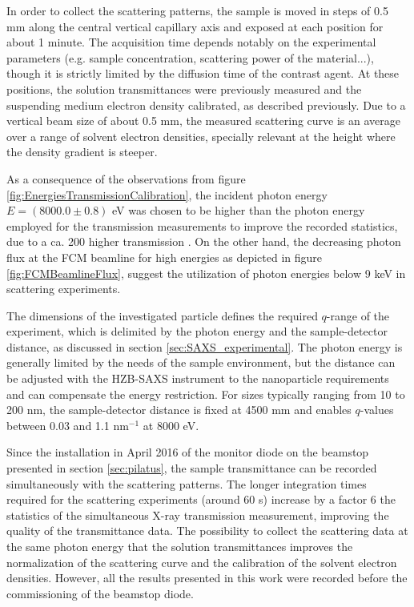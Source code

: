 In order to collect the scattering patterns, the sample is moved in steps of 0.5 mm along the central vertical capillary axis and exposed at each position for about 1 minute. The acquisition time depends notably on the experimental parameters (e.g. sample concentration, scattering power of the material...), though it is strictly limited by the diffusion time of the contrast agent. At these positions, the solution transmittances were previously measured and the suspending medium electron density calibrated, as described previously. Due to a vertical beam size of about 0.5 mm, the measured scattering curve is an average over a range of solvent electron densities, specially relevant at the height where the density gradient is steeper. 

As a consequence of the observations from figure \ref{fig:EnergiesTransmissionCalibration}, the incident photon energy \(E = \left(8000.0  \pm 0.8\right)\) eV was chosen to be higher than the photon energy employed for the transmission measurements to improve the recorded statistics, due to a ca. 200 higher transmission \citep{henke_x-ray_1993}. On the other hand, the decreasing photon flux at the FCM beamline for high energies as depicted in figure \ref{fig:FCMBeamlineFlux}, suggest the utilization of photon energies below 9 keV in scattering experiments.

The dimensions of the investigated particle defines the required $q$-range of the experiment, which is delimited by the photon energy and the sample-detector distance, as discussed in section \ref{sec:SAXS_experimental}. The photon energy is generally limited by the needs of the sample environment, but the distance can be adjusted with the HZB-SAXS instrument to the nanoparticle requirements and can compensate the energy restriction. For sizes typically ranging from 10 to 200 nm, the sample-detector distance is fixed at 4500 mm and enables $q$-values between 0.03 and 1.1 nm$^{-1}$ at 8000 eV.

Since the installation in April 2016 of the monitor diode on the beamstop presented in section \ref{sec:pilatus}, the sample transmittance can be recorded simultaneously with the scattering patterns. The longer integration times required for the scattering experiments (around 60 s) increase by a factor 6 the statistics of the simultaneous X-ray transmission measurement, improving the quality of the transmittance data. The possibility to collect the scattering data at the same photon energy that the solution transmittances improves the normalization of the scattering curve and the calibration of the solvent electron densities. However, all the results presented in this work were recorded before the commissioning of the beamstop diode.

